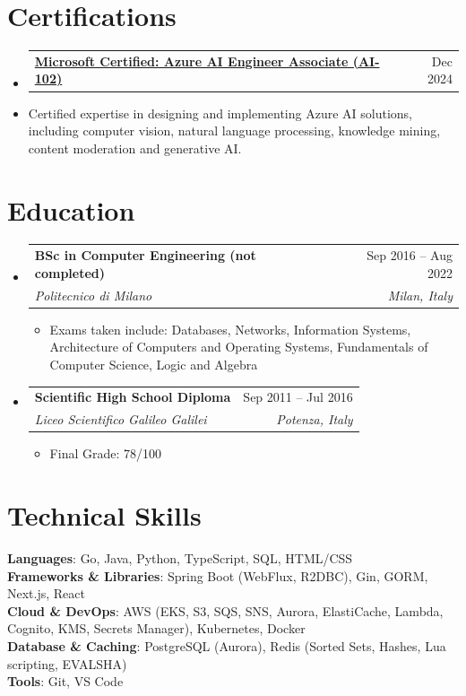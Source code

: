 \documentclass[letterpaper,11pt]{article}
\makeatletter
\newcommand{\resumeItem}[1]{
	\item\small{
		{#1 \vspace{-2pt}}
	}
}
\newcommand{\resumeSubheading}[4]{
	\vspace{-2pt}\item
	\begin{tabular*}{0.97\textwidth}[t]{l@{\extracolsep{\fill}}r}
		\textbf{#1} & #2 \\
		\textit{\small#3} & \textit{\small #4} \\
	\end{tabular*}\vspace{-7pt}
}
\newcommand{\resumeSubheadingWithoutLocation}[4]{
	\vspace{-2pt}\item
	\begin{tabular*}{0.97\textwidth}[t]{l@{\extracolsep{\fill}}r}
		\textbf{#1} & #2 \\
	\end{tabular*}\vspace{-7pt}
}
\newcommand{\resumeSubHeadingListStart}{\begin{itemize}[leftmargin=0.15in, label={}]}
\newcommand{\resumeSubHeadingListEnd}{\end{itemize}}
\newcommand{\resumeItemListStart}{\begin{itemize}}
\newcommand{\resumeItemListEnd}{\end{itemize}\vspace{-5pt}}
\makeatother
\begin{document}
	\section{Certifications}
	\resumeSubHeadingListStart
	\resumeSubheadingWithoutLocation
	{\href{https://learn.microsoft.com/api/credentials/share/en-us/ClaudioGenovese-4278/BA0AD04DE20802C7?sharingId=3EEC5AAB73F3537D}{Microsoft Certified: Azure AI Engineer Associate (AI-102)}}{Dec 2024}
	{}{}
	\resumeItem{Certified expertise in designing and implementing Azure AI solutions, including computer vision, natural language processing, knowledge mining, content moderation and generative AI.}
	\resumeSubHeadingListEnd
	\section{Education}
	\resumeSubHeadingListStart
	\resumeSubheading
	{BSc in Computer Engineering (not completed)}{Sep 2016 -- Aug 2022}
	{Politecnico di Milano}{Milan, Italy}
	\resumeItemListStart
	\resumeItem{Exams taken include: Databases, Networks, Information Systems, Architecture of Computers and Operating Systems, Fundamentals of Computer Science, Logic and Algebra}
	\resumeItemListEnd
	\vspace{4pt}
	\resumeSubheading
	{Scientific High School Diploma}{Sep 2011 -- Jul 2016}
	{Liceo Scientifico Galileo Galilei}{Potenza, Italy}
	\resumeItemListStart
	\resumeItem{Final Grade: 78/100}
	\resumeItemListEnd
	\resumeSubHeadingListEnd
	\section{Technical Skills}
	\begin{itemize}[leftmargin=0.15in, label={}]
		\small{\item{
				\textbf{Languages}{: Go, Java, Python, TypeScript, SQL, HTML/CSS} \\
				\textbf{Frameworks \& Libraries}{: Spring Boot (WebFlux, R2DBC), Gin, GORM, Next.js, React} \\
				\textbf{Cloud \& DevOps}{: AWS (EKS, S3, SQS, SNS, Aurora, ElastiCache, Lambda, Cognito, KMS, Secrets Manager), Kubernetes, Docker} \\
				\textbf{Database \& Caching}{: PostgreSQL (Aurora), Redis (Sorted Sets, Hashes, Lua scripting, EVALSHA)} \\
				\textbf{Tools}{: Git, VS Code}
		}}
	\end{itemize}
\end{document}

